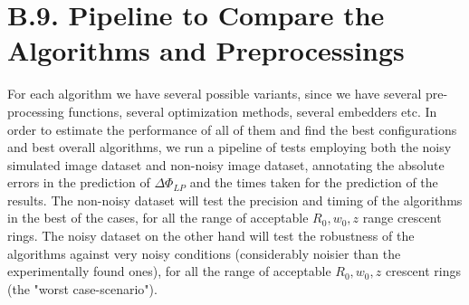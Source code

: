 \documentclass[11pt, a4paper, twoside]{article} %
\begin{document}

\section*{B.9. Pipeline to Compare the Algorithms and Preprocessings}

For each algorithm we have several possible variants, since we have several pre-processing functions, several optimization methods, several embedders etc. In order to estimate the performance of all of them and find the best configurations and best overall algorithms, we run a pipeline of tests employing both the noisy simulated image dataset and non-noisy image dataset, annotating the absolute errors in the prediction of $\Delta\Phi_{LP}$ and the times taken for the prediction of the results. The non-noisy dataset will test the precision and timing of the algorithms in the best of the cases, for all the range of acceptable $R_0,w_0,z$ range crescent rings. The noisy dataset on the other hand will test the robustness of the algorithms against very noisy conditions (considerably noisier than the experimentally found ones), for all the range of acceptable $R_0,w_0,z$ crescent rings (the "worst case-scenario").
\end{document}
